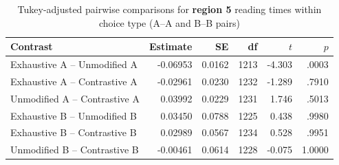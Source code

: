 \documentclass[a4paper, ruler]{CUP-JNL-LIN}%
\begin{document}

\begin{table}[htbp]
\centering
\caption{Tukey-adjusted pairwise comparisons for \textbf{region 5} reading times within choice type (A--A and B--B pairs)}
\label{tab:r5-pairwise-within-choice}
\begin{tabularx}{\textwidth}{@{}Xrrrrr@{}}
\toprule
Contrast & Estimate & SE & df & $t$ & $p$ \\
\midrule
Exhaustive A -- Unmodified A   & -0.06953 & 0.0162 & 1213 & -4.303 & .0003 \\
Exhaustive A -- Contrastive A  & -0.02961 & 0.0230 & 1232 & -1.289 & .7910 \\
Unmodified A -- Contrastive A  &  0.03992 & 0.0229 & 1231 &  1.746 & .5013 \\
Exhaustive B -- Unmodified B   &  0.03450 & 0.0788 & 1225 &  0.438 & .9980 \\
Exhaustive B -- Contrastive B  &  0.02989 & 0.0567 & 1234 &  0.528 & .9951 \\
Unmodified B -- Contrastive B  & -0.00461 & 0.0614 & 1228 & -0.075 & 1.0000 \\
\bottomrule
\end{tabularx}
\end{table}
\end{document}
